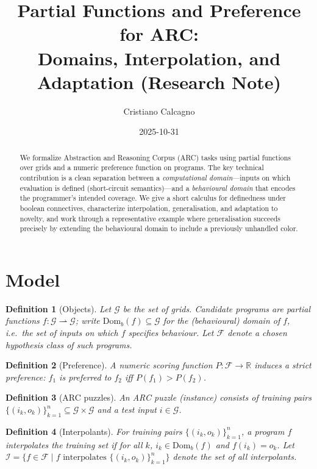 \documentclass[11pt]{article}
\title{Partial Functions and Preference for ARC:\\
Domains, Interpolation, and Adaptation (Research Note)}
\author{Cristiano Calcagno}
\date{2025-10-31}
\newtheorem{definition}{Definition}
\newcommand{\G}{\mathcal{G}}
\newcommand{\F}{\mathcal{F}}
\newcommand{\Domb}{\mathrm{Dom}_b}
\begin{document}
\maketitle

\begin{abstract}
We formalize Abstraction and Reasoning Corpus (ARC) tasks using partial functions over grids and a numeric preference function on programs. The key technical contribution is a clean separation between a \emph{computational domain}---inputs on which evaluation is defined (short-circuit semantics)---and a \emph{behavioural domain} that encodes the programmer's intended coverage. We give a short calculus for definedness under boolean connectives, characterize interpolation, generalisation, and adaptation to novelty, and work through a representative example where generalisation succeeds precisely by extending the behavioural domain to include a previously unhandled color.
\end{abstract}

\section{Model}

\begin{definition}[Objects]
Let $\G$ be the set of grids. Candidate programs are partial functions $f:\G\rightharpoonup \G$; write $\Domb(f)\subseteq \G$ for the (behavioural) domain of $f$, i.e.\ the set of inputs on which $f$ \emph{specifies} behaviour. Let $\F$ denote a chosen hypothesis class of such programs.
\end{definition}

\begin{definition}[Preference]
A numeric scoring function $P:\F\to\mathbb{R}$ induces a strict preference: $f_1$ is preferred to $f_2$ iff $P(f_1)>P(f_2)$.
\end{definition}

\begin{definition}[ARC puzzles]
An ARC puzzle (instance) consists of training pairs $\{(i_k,o_k)\}_{k=1}^n\subseteq \G\times\G$ and a test input $i\in\G$.
\end{definition}

\begin{definition}[Interpolants]
For training pairs $\{(i_k,o_k)\}_{k=1}^n$, a program $f$ \emph{interpolates} the training set if for all $k$, $i_k\in\Domb(f)$ and $f(i_k)=o_k$. Let $\mathcal{I}=\{f\in\F\mid f \text{ interpolates } \{(i_k,o_k)\}_{k=1}^n\}$ denote the set of all interpolants.
\end{definition}
\end{document}
